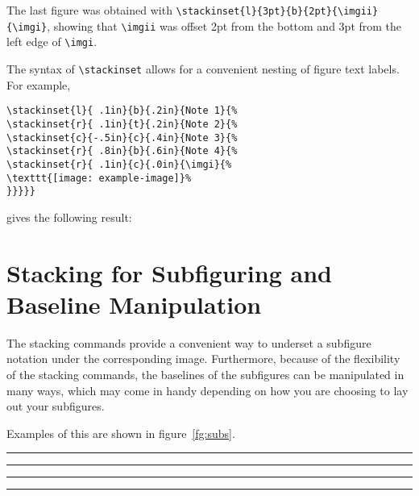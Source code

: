 \documentclass{article}
\def\rl{\rule[-.3pt]{2ex}{.6pt}}
\let\vb\verb
\def\blmark{\rl\stackengine{-.9ex}{B}{\rule{.35ex}{0pt}L}{U}{l}{F}{T}{S}\rl}
\begin{document}
The last figure was obtained with
\vb|\stackinset{l}{3pt}{b}{2pt}{\imgii}{\imgi}|,
showing that \vb|\imgii| was offset 2pt from the bottom and 3pt from
the left edge of \vb|\imgi|.

The syntax of \vb|\stackinset| allows for a convenient nesting of
figure text labels.  For example,

\begin{verbatim}
\stackinset{l}{ .1in}{b}{.2in}{Note 1}{%
\stackinset{r}{ .1in}{t}{.2in}{Note 2}{%
\stackinset{c}{-.5in}{c}{.4in}{Note 3}{%
\stackinset{r}{ .8in}{b}{.6in}{Note 4}{%
\stackinset{r}{ .1in}{c}{.0in}{\imgi}{%
\texttt{[image: example-image]}%
}}}}}
\end{verbatim}

gives the following result:\begin{verbbox}[\small]\stackinset\end{verbbox}

{%
%
}

\clearpage
\section{Stacking for Subfiguring and Baseline Manipulation\label{s:bm}}

The stacking commands provide a convenient way to underset a subfigure
notation under the corresponding image.  Furthermore, because of the
flexibility of the stacking commands, the baselines of the subfigures
can be manipulated in many ways, which may come in handy depending on
how you are choosing to lay out your subfigures.

Examples of this are shown in figure~\ref{fg:subs}. 

%
%
\begin{myverbbox}{\figa}\end{myverbbox}%
\begin{myverbbox}{\figb}\end{myverbbox}%
\begin{myverbbox}[\small]{\figc}
\end{myverbbox}%
\begin{myverbbox}%
{\figd}\end{myverbbox}%
\def\CaptionJustification{\raggedright}%
{\blmark\rl\rl%
~~
~~
~~
}%
\end{document}
